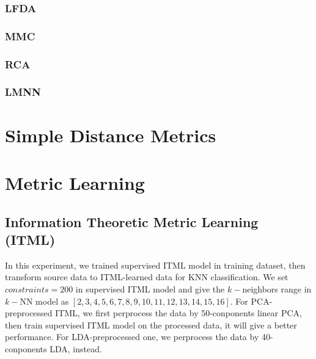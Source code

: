 \documentclass[conference]{IEEEtran}
\begin{document}
\subsubsection{LFDA}
\par
\subsubsection{MMC}
\par
\subsubsection{RCA}
\par
\subsubsection{LMNN}
\par
\section{Simple Distance Metrics}
\section{Metric Learning}
\subsection{Information Theoretic Metric Learning (ITML)}

In this experiment, we trained supervised ITML model in training dataset, then transform source data to ITML-learned data for KNN classification. We set $constraints=200$ in supervised ITML model and give the $k-$neighbors range in $k-$NN model as $[2, 3, 4, 5, 6, 7, 8, 9, 10, 11, 12, 13, 14, 15, 16]$. For PCA-preprocessed ITML, we first perprocess the data by 50-conponents linear PCA, then train supervised ITML model on the processed data, it will give a better performance. For LDA-preprocessed one, we perprocess the data by 40-conponents LDA, instead.
\end{document}
